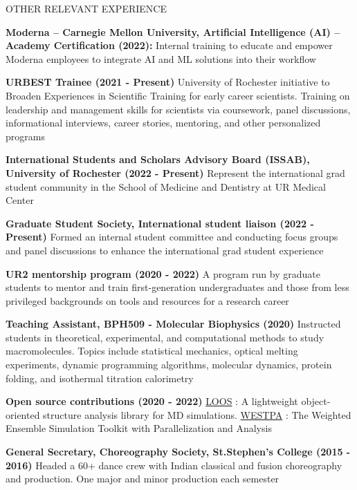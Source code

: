 \documentclass{resume} %
\begin{document}

\begin{rSection}{OTHER RELEVANT EXPERIENCE}
\vspace{-1.25em}
\item \textbf{Moderna – Carnegie Mellon University, Artificial Intelligence (AI) – Academy Certification (2022):} { 
Internal training to educate and empower Moderna employees to integrate AI and ML solutions into their workflow} 
\item \textbf{URBEST Trainee (2021 - Present)} {University of Rochester initiative to Broaden Experiences in Scientific Training for early career scientists. Training on leadership and management skills for scientists via coursework, panel discussions, informational interviews, career stories, mentoring, and other personalized programs}
\item \textbf{International Students and Scholars Advisory Board (ISSAB), University of Rochester (2022 - Present)} {Represent the international grad student community in the School of Medicine and Dentistry at UR Medical Center}
\item \textbf{Graduate Student Society, International student liaison (2022 - Present)} {Formed an internal student committee and conducting focus groups and panel discussions to enhance the international grad student experience}
\item \textbf{UR2 mentorship program (2020 - 2022)} {A program run by graduate students to mentor and train first-generation undergraduates and those from less privileged backgrounds on tools and resources for a research career}
\item \textbf{Teaching Assistant, BPH509 - Molecular Biophysics (2020)} {Instructed students in theoretical, experimental, and computational methods to study macromolecules. Topics include statistical mechanics, optical melting experiments, dynamic 
programming algorithms, molecular dynamics, protein folding, and isothermal titration calorimetry
}
\item \textbf{Open source contributions (2020 - 2022)} {\href{https://github.com/GrossfieldLab/loos}{LOOS} : A lightweight object-oriented structure analysis library for MD simulations.
\href{https://github.com/westpa/westpa}{WESTPA} : The Weighted Ensemble Simulation Toolkit with Parallelization and Analysis}
\item \textbf{General Secretary, Choreography Society, St.Stephen's College (2015 - 2016)} {Headed a 60+ dance crew with Indian classical and fusion choreography and production. One major and minor production each semester }
\end{rSection} 
\end{document}
